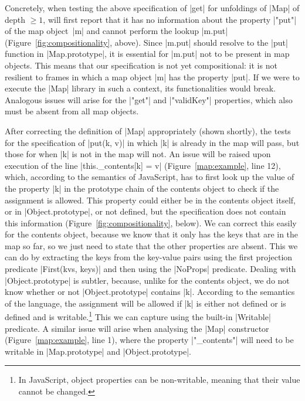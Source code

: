 Concretely, when testing the above specification of \jsinline|get| for unfoldings of \jsinline|Map| of depth $\geq 1$, \cosette will first report that it has no information about the property \jsinline|"put"| of the map object~\jsinline|m| and cannot perform the lookup \jsinline|m.put| (Figure~\ref{fig:compositionality}, above). 
Since \jsinline|m.put| should resolve to the \jsinline|put| function in \jsinline|Map.prototype|, it is essential for \jsinline|m.put| not to be present in map objects. 
This means that our specification is not yet compositional: it is not resilient to frames in which a map object \jsinline|m| has the property \jsinline|put|. If we were to execute the \jsinline|Map| library in such a context, its functionalities would break.
Analogous issues will arise for the \jsinline|"get"| and \jsinline|"validKey"| properties, which also must be absent from all map objects. 

After correcting the definition of \jsinline|Map| appropriately (shown shortly), the tests for the specification of \jsinline|put(k, v)| in which \jsinline|k| is already in the map will pass, but those for when \jsinline|k| is not in the map will not. An issue will be raised upon execution of the line \jsinline|this._contents[k] = v| (Figure~\ref{map:example}, line 12), which, according to the semantics of JavaScript, has to first look up the value of the property \jsinline|k| in the prototype chain of the contents object to check if the assignment is allowed. This property could either be in the contents object itself, or in \jsinline|Object.prototype|, or not defined, but the specification does not contain this information (Figure~\ref{fig:compositionality}, below). We can correct this easily for the contents object, because we know that it only has the keys that are in the map so far, so we just need to state that the other properties are absent. This we can do by extracting the keys from the key-value pairs using the first projection predicate \jsinline|First(kvs, keys)| and then using the \jsinline|NoProps| predicate. Dealing with \jsinline|Object.prototype| is subtler, because, unlike for the contents object, we do not know whether or not \jsinline|Object.prototype| contains \jsinline|k|. According to the semantics of the language, the assignment will be allowed if \jsinline|k| is either not defined or is defined and is writable.\footnote{In JavaScript, object properties can be non-writable, meaning that their value cannot be changed.} This we can capture using the built-in \jsinline|Writable| predicate. A similar issue will arise when analysing the \jsinline|Map| constructor (Figure~\ref{map:example}, line 1), where the property \jsinline|"_contents"| will need to be writable in \jsinline|Map.prototype| and \jsinline|Object.prototype|.

